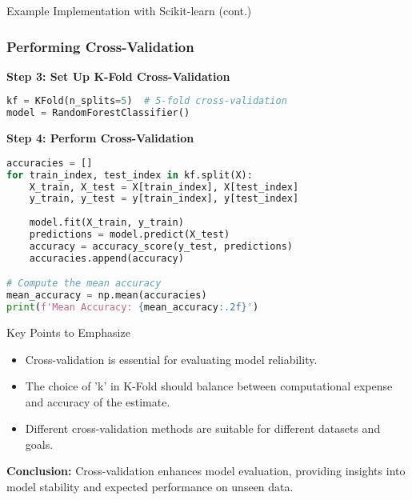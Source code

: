 \documentclass[aspectratio=169]{beamer}
\begin{document}
\begin{frame}[fragile]{Example Implementation with Scikit-learn (cont.)}
    \frametitle{Performing Cross-Validation}
    \textbf{Step 3: Set Up K-Fold Cross-Validation}
    \begin{lstlisting}[language=Python]
kf = KFold(n_splits=5)  # 5-fold cross-validation
model = RandomForestClassifier()
    \end{lstlisting}
    
    \textbf{Step 4: Perform Cross-Validation}
    \begin{lstlisting}[language=Python]
accuracies = []
for train_index, test_index in kf.split(X):
    X_train, X_test = X[train_index], X[test_index]
    y_train, y_test = y[train_index], y[test_index]
    
    model.fit(X_train, y_train)
    predictions = model.predict(X_test)
    accuracy = accuracy_score(y_test, predictions)
    accuracies.append(accuracy)

# Compute the mean accuracy
mean_accuracy = np.mean(accuracies)
print(f'Mean Accuracy: {mean_accuracy:.2f}')
    \end{lstlisting}
\end{frame}

\begin{frame}{Key Points to Emphasize}
    \begin{itemize}
        \item Cross-validation is essential for evaluating model reliability.
        \item The choice of 'k' in K-Fold should balance between computational expense and accuracy of the estimate.
        \item Different cross-validation methods are suitable for different datasets and goals.
    \end{itemize}
    
    \textbf{Conclusion:} Cross-validation enhances model evaluation, providing insights into model stability and expected performance on unseen data.
\end{frame}
\end{document}
